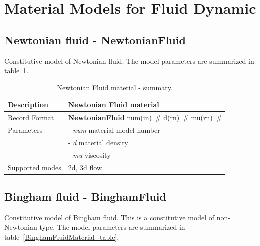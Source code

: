 \documentclass[a4paper]{article}
\newcommand{\descitem}[1]{{\noindent \bf #1}}
\newcommand{\elemparam}[2]{{{#1\tiny (#2)}~\#}}
\newcommand{\param}[1]{{\it #1}}
\begin{document}
\clearpage

\section{Material Models for Fluid Dynamic}
\subsection{Newtonian fluid - NewtonianFluid}
\label{NewtonianFluidMaterial}
Constitutive model of Newtonian fluid. The model parameters are summarized
in table~\ref{NewtonianFluidMaterial_table}.

\begin{table}[!htb]
\begin{tabular}{|l|p{9cm}|}
\hline
Description & Newtonian Fluid material\\
\hline
Record Format & \descitem{NewtonianFluid} \elemparam{num}{in}
\elemparam{d}{rn} \elemparam{mu}{rn}\\
Parameters &- \param{num} material model number\\
&- \param{d} material density\\
&- \param{mu} viscosity\\
Supported modes& 2d, 3d flow\\
\hline
\end{tabular}
\caption{Newtonian Fluid material - summary.}
\label{NewtonianFluidMaterial_table}
\end{table}



\subsection{Bingham fluid - BinghamFluid}
\label{BinghamFluidMaterial}
Constitutive model of Bingham fluid. This is a constitutive model of
non-Newtonian type. The model parameters are summarized
in table~\ref{BinghamFluidMaterial_table}.
\end{document}
